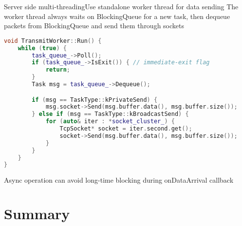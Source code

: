 \documentclass{beamer}
\begin{document}
\begin{frame}[fragile]{Server side multi-threading}{Use standalone worker thread for data sending}
The worker thread always waits on BlockingQueue for a new task,
then dequeue packets from BlockingQueue and send them through sockets
\begin{lstlisting}[language=c++,basicstyle=\ttfamily\tiny]
void TransmitWorker::Run() {
    while (true) {
        task_queue_->Poll();
        if (task_queue_->IsExit()) { // immediate-exit flag
            return;
        }
        Task msg = task_queue_->Dequeue();

        if (msg == TaskType::kPrivateSend) {
            msg.socket->Send(msg.buffer.data(), msg.buffer.size());
        } else if (msg == TaskType::kBroadcastSend) {
            for (auto& iter : *socket_cluster_) {
                TcpSocket* socket = iter.second.get();
                socket->Send(msg.buffer.data(), msg.buffer.size());
            }
        }
    }
}
\end{lstlisting}
Async operation can avoid long-time blocking during onDataArrival callback
\end{frame}


\section*{Summary}
\end{document}
